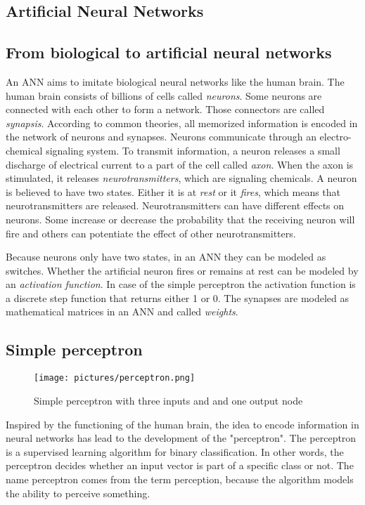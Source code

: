 \subsection{Artificial Neural Networks}
\subsection*{From biological to artificial neural networks}
An \acf{ANN} aims to imitate biological neural networks like the human brain. The human brain consists of billions of cells called \textit{neurons}. Some neurons are connected with each other to form a network. Those connectors are called \textit{synapsis}. According to common theories, all memorized information is encoded in the network of neurons and synapses. Neurons communicate through an electro-chemical signaling system. To transmit information, a neuron releases a small discharge of electrical current to a part of the cell called \textit{axon}. When the axon is stimulated, it releases \textit{neurotransmitters}, which are signaling chemicals. 
A neuron is believed to have two states. Either it is at \textit{rest} or it \textit{fires}, which means that neurotransmitters are released. 
Neurotransmitters can have different effects on neurons. Some increase or decrease the probability that the receiving neuron will fire and others can potentiate the effect of other neurotransmitters.

Because neurons only have two states, in an \ac{ANN} they can be modeled as switches. Whether the artificial neuron fires or remains at rest can be modeled by an \textit{activation function}. In case of the simple perceptron the activation function is a discrete step function that returns either 1 or 0. The synapses are modeled as mathematical matrices in an \ac{ANN} and called \textit{weights}.
\cite{haykin2009neural,knudsen1994supervised}

\subsection*{Simple perceptron}
\begin{figure}[ht]
    \centering 
    \texttt{[image: pictures/perceptron.png]}
    \caption{Simple perceptron with three inputs and and one output node \cite{nielsen2015neural}}
    \label{pic:perceptron}    %
\end{figure}
Inspired by the functioning of the human brain, the idea to encode information in neural networks has lead to the development of the "perceptron". The perceptron is a supervised learning algorithm for binary classification. In other words, the perceptron decides whether an input vector is part of a specific class or not. The name perceptron comes from the term perception, because the algorithm models the ability to perceive something. 

